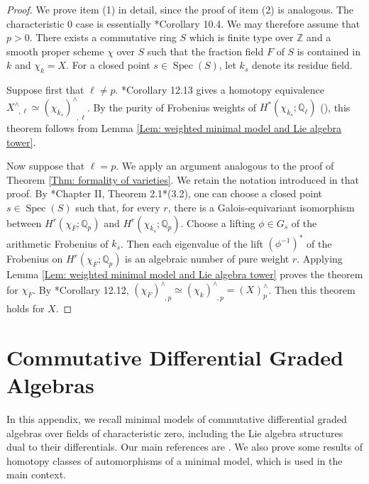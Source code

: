 \documentclass[11pt]{amsart}
\theoremstyle{definition}
\numberwithin{equation}{section}
\numberwithin{equation}{section}
\newcommand\QQ{\mathbb{Q}}
\newcommand\ZZ{\mathbb{Z}}
\DeclareMathOperator{\et}{\acute{e}t}
\DeclareMathOperator{\Spec}{Spec}
\begin{document}
\begin{proof}
We prove item (1) in detail, since the proof of item (2) is analogous. The characteristic $0$ case is essentially \cite{Morgan-hodge-theory}*{Corollary 10.4}. We may therefore assume that $p>0$.
There exists a commutative ring $S$ which is finite type over $\ZZ$ and a smooth proper scheme $\chi$ over $S$ such that the fraction field $F$ of $S$ is contained in $k$ and $\chi_{k}=X$. For a closed point $s\in \Spec(S)$, let $k_s$ denote its residue field.

Suppose first that $\ell\neq p$. \cite{Artin-Mazur-etale-homotopy}*{Corollary 12.13} gives a homotopy equivalence $X^{\wedge}_{\et,\ell}\simeq (\chi_{\overline{k}_s})^{\wedge}_{\et,\ell}$. By the purity of Frobenius weights of $H^*_{\et}(\chi_{\overline{k}_s};\QQ_{\ell})$ (\cite{Deligne-Weil-II}), this theorem follows from Lemma \ref{Lem: weighted minimal model and Lie algebra tower}.

Now suppose that $\ell=p$. We apply an argument analogous to the proof of Theorem \ref{Thm: formality of varieties}. We retain the notation introduced in that proof. By \cite{Gros-Suwa}*{Chapter II, Theorem 2.1}\cite{Jannsen-weights}*{(3.2)}, one can choose a closed point $s\in \Spec(S)$ such that, for every $r$, there is a Galois-equivariant isomorphism between $H^r_{\et}(\chi_{\overline{F}};\QQ_{p})$ and  $H^r_{\et}(\chi_{\overline{k_s}};\QQ_{p})$. Choose a lifting $\phi\in G_s$ of the arithmetic Frobenius of $k_s$. Then each eigenvalue of the lift  $(\phi^{-1})^*$ of the Frobenius on $H^r_{\et}(\chi_{\overline{F}};\QQ_{p})$ is an algebraic number of pure weight $r$. Applying Lemma \ref{Lem: weighted minimal model and Lie algebra tower} proves the theorem for $\chi_{\overline{F}}$. By \cite{Artin-Mazur-etale-homotopy}*{Corollary 12.12}, $(\chi_{\overline{F}})^{\wedge}_{\et,p}\simeq (\chi_{k})^{\wedge}_{\et,p}=(X_{\et})^{\wedge}_p$. Then this theorem holds for $X$. 
\end{proof}

\appendix

\section{Commutative Differential Graded Algebras}

In this appendix, we recall minimal models of commutative differential graded algebras over fields of characteristic zero, including the Lie algebra structures dual to their differentials. Our main references are \cite{Deligne-Griffiths-Morgan-Sullivan-formality}\cite{MGriffiths-Morgan-rational-homotopy}\cite{Morgan-hodge-theory}\cite{Sullivan-rational-homotopy}. We also prove some results of homotopy classes of automorphisms of a minimal model, which is used in the main context.
\end{document}
